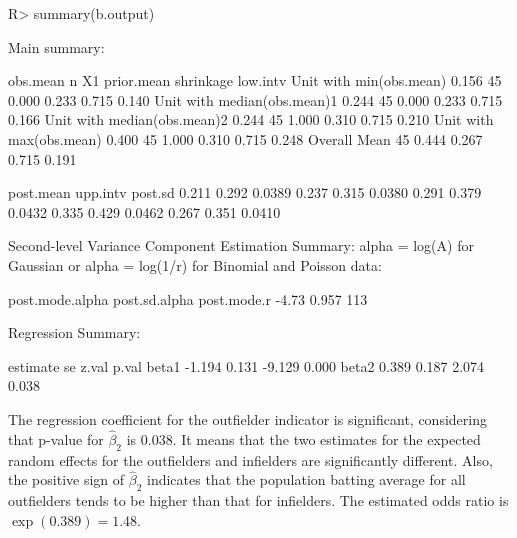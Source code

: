 \documentclass[article]{jss}
\begin{document}
\begin{CodeChunk}
\begin{CodeInput}
R> summary(b.output)
\end{CodeInput}
\begin{CodeOutput}
Main summary:

                            obs.mean  n    X1 prior.mean shrinkage low.intv 
Unit with min(obs.mean)        0.156 45 0.000      0.233     0.715    0.140     
Unit with median(obs.mean)1    0.244 45 0.000      0.233     0.715    0.166     
Unit with median(obs.mean)2    0.244 45 1.000      0.310     0.715    0.210     
Unit with max(obs.mean)        0.400 45 1.000      0.310     0.715    0.248     
Overall Mean                         45 0.444      0.267     0.715    0.191     


                            post.mean upp.intv post.sd
                                0.211    0.292  0.0389
                                0.237    0.315  0.0380
                                0.291    0.379  0.0432
                                0.335    0.429  0.0462
                                0.267    0.351  0.0410

Second-level Variance Component Estimation Summary:
alpha = log(A) for Gaussian or alpha =  log(1/r) for Binomial and Poisson data:

post.mode.alpha post.sd.alpha post.mode.r
          -4.73         0.957         113


Regression Summary:

      estimate    se  z.val p.val
beta1   -1.194 0.131 -9.129 0.000
beta2    0.389 0.187  2.074 0.038
\end{CodeOutput}
\end{CodeChunk}

The regression coefficient for the outfielder indicator is significant, considering that p-value for $\hat{\beta}_2$ is 0.038. It means that the  two estimates for the expected random effects for the outfielders and infielders are significantly different. Also, the positive sign of $\hat{\beta}_{2}$ indicates that the population batting average for all outfielders tends to be higher than that for infielders. The  estimated odds ratio is $\exp(0.389)=1.48$.
\end{document}
